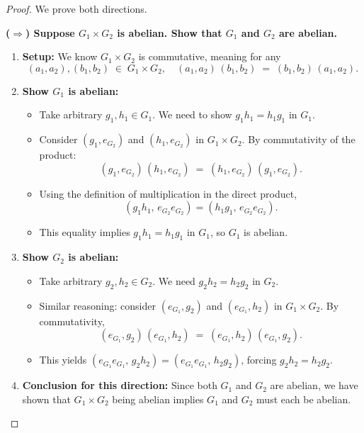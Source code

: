 \documentclass[12pt]{article}
\theoremstyle{definition} %
\theoremstyle{plain} %
\begin{document}
\begin{proof}
We prove both directions.

\bigskip
\noindent\textbf{(\(\Longrightarrow\)) Suppose $G_1\times G_2$ is abelian. Show that $G_1$ and $G_2$ are abelian.}

\begin{enumerate}
  \item \textbf{Setup:} We know $G_1\times G_2$ is commutative, meaning for any 
  \[
    (a_1, a_2), (b_1, b_2) \;\in\; G_1\times G_2,
    \quad
    (a_1,a_2)\,(b_1,b_2) \;=\; (b_1,b_2)\,(a_1,a_2).
  \]
  
  \item \textbf{Show $G_1$ is abelian:}
    \begin{itemize}
      \item Take arbitrary $g_1, h_1 \in G_1$. We need to show $g_1 h_1 = h_1 g_1$ in $G_1$.
      \item Consider $(g_1,e_{G_2})$ and $(h_1, e_{G_2})$ in $G_1\times G_2$. By commutativity of the product:
      \[
        (g_1, e_{G_2}) \,(h_1, e_{G_2}) \;=\; (h_1, e_{G_2})\,(g_1, e_{G_2}).
      \]
      \item Using the definition of multiplication in the direct product,
      \[
        (g_1 h_1,\, e_{G_2} e_{G_2}) = (h_1 g_1,\, e_{G_2} e_{G_2}).
      \]
      \item This equality implies $g_1 h_1 = h_1 g_1$ in $G_1$, so $G_1$ is abelian.
    \end{itemize}

  \item \textbf{Show $G_2$ is abelian:}
    \begin{itemize}
      \item Take arbitrary $g_2, h_2 \in G_2$. We need $g_2 h_2 = h_2 g_2$ in $G_2$.
      \item Similar reasoning: consider $(e_{G_1},g_2)$ and $(e_{G_1},h_2)$ in $G_1\times G_2$. By commutativity,
      \[
        (e_{G_1}, g_2)\,(e_{G_1}, h_2) \;=\; (e_{G_1}, h_2)\,(e_{G_1}, g_2).
      \]
      \item This yields $(e_{G_1} e_{G_1},\, g_2 h_2) = (e_{G_1} e_{G_1},\, h_2 g_2)$, forcing $g_2 h_2 = h_2 g_2$.
    \end{itemize}

  \item \textbf{Conclusion for this direction:} Since both $G_1$ and $G_2$ are abelian, we have shown that $G_1 \times G_2$ being abelian implies $G_1$ and $G_2$ must each be abelian.
\end{enumerate}


\end{proof}
\end{document}
